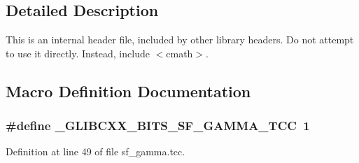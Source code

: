 \subsection{Detailed Description}
This is an internal header file, included by other library headers. Do not attempt to use it directly. Instead, include $<$cmath$>$. 

\subsection{Macro Definition Documentation}
\subsubsection[{\texorpdfstring{\+\_\+\+G\+L\+I\+B\+C\+X\+X\+\_\+\+B\+I\+T\+S\+\_\+\+S\+F\+\_\+\+G\+A\+M\+M\+A\+\_\+\+T\+CC}{_GLIBCXX_BITS_SF_GAMMA_TCC}}]{\setlength{\rightskip}{0pt plus 5cm}\#define \+\_\+\+G\+L\+I\+B\+C\+X\+X\+\_\+\+B\+I\+T\+S\+\_\+\+S\+F\+\_\+\+G\+A\+M\+M\+A\+\_\+\+T\+CC~1}\hypertarget{sf__gamma_8tcc_accc383e52e4dc6eebfd313a52961b49b}{}\label{sf__gamma_8tcc_accc383e52e4dc6eebfd313a52961b49b}


Definition at line 49 of file sf\+\_\+gamma.\+tcc.

